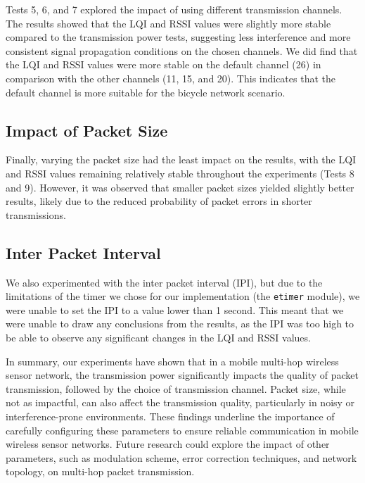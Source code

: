 \documentclass[runningheads]{llncs}
\begin{document}
Tests 5, 6, and 7 explored the impact of using different transmission channels. The results showed that the LQI and RSSI values were slightly more stable compared to the transmission power tests, suggesting less interference and more consistent signal propagation conditions on the chosen channels. We did find that the LQI and RSSI values were more stable on the default channel (26) in comparison with the other channels (11, 15, and 20). This indicates that the default channel is more suitable for the bicycle network scenario.


\subsection{Impact of Packet Size}

Finally, varying the packet size had the least impact on the results, with the LQI and RSSI values remaining relatively stable throughout the experiments (Tests 8 and 9). However, it was observed that smaller packet sizes yielded slightly better results, likely due to the reduced probability of packet errors in shorter transmissions.

\subsection{Inter Packet Interval}

We also experimented with the inter packet interval (IPI), but due to the limitations of the timer we chose for our implementation (the \texttt{etimer} module), we were unable to set the IPI to a value lower than 1 second. This meant that we were unable to draw any conclusions from the results, as the IPI was too high to be able to observe any significant changes in the LQI and RSSI values.

In summary, our experiments have shown that in a mobile multi-hop wireless sensor network, the transmission power significantly impacts the quality of packet transmission, followed by the choice of transmission channel. Packet size, while not as impactful, can also affect the transmission quality, particularly in noisy or interference-prone environments. These findings underline the importance of carefully configuring these parameters to ensure reliable communication in mobile wireless sensor networks. Future research could explore the impact of other parameters, such as modulation scheme, error correction techniques, and network topology, on multi-hop packet transmission.
\end{document}
